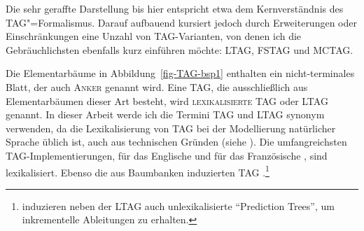 Die sehr geraffte Darstellung bis hier entspricht etwa dem Kernverständnis des TAG"=Formalismus. Darauf aufbauend kursiert jedoch durch Erweiterungen oder Einschränkungen eine Unzahl von TAG-Varianten, von denen ich die Gebräuchlichsten ebenfalls kurz einführen möchte: LTAG, FSTAG und MCTAG.  

Die Elementarbäume in Abbildung~\ref{fig-TAG-bsp1} enthalten ein nicht-terminales Blatt, der auch \textsc{Anker} genannt wird. Eine TAG, die ausschlie\ss lich aus Elementarbäumen dieser Art besteht, wird \textsc{lexikalisierte TAG} oder LTAG genannt. In dieser Arbeit werde ich die Termini TAG und LTAG synonym verwenden, da die Lexikalisierung von TAG bei der Modellierung natürlicher Sprache üblich ist, auch aus technischen Gründen (siehe \citealt{Schabes:etal:88, Schabes:90, Schabes:Joshi:90, Joshi:Schabes:91b}). Die umfangreichsten TAG-Implementierungen,  für das Englische \citep{xtag:01} und  für das Französische \citep{Abeille:02}, sind lexikalisiert. Ebenso die aus Baumbanken induzierten TAG \citep{Chiang:00,Xia:01,Chen:etal:06,Kaehammer:Demberg:12}.\footnote{\cite{Kaehammer:Demberg:12} induzieren neben der LTAG auch unlexikalisierte "`Prediction Trees"', um inkrementelle Ableitungen zu erhalten.}

